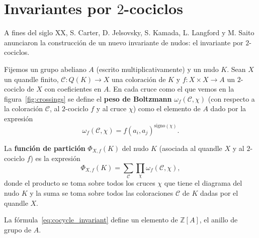 \documentclass[graybox]{svmult}
\newcommand{\Z}{\mathbb{Z}}
\begin{document}
\section{Invariantes por $2$-cociclos}
\label{section:cocycles}

A fines del siglo XX, S. Carter, D. Jelsovsky, S. Kamada, L. Langford y M.
Saito anunciaron la construcción de un nuevo invariante de nudos: el invariante
por $2$-cociclos.

Fijemos un grupo abeliano $A$ (escrito multiplicativamente) y un nudo $K$.
Sean $X$ un quandle finito, $\mathcal{C}\colon Q(K)\to X$ una coloración de $K$ y 
$f\colon X\times X\to A$ 
un $2$-cociclo de $X$ con coeficientes en $A$. En cada cruce como el que vemos en la
figura~\ref{fig:crossings} se define el \textbf{peso de Boltzmann}
$\omega_f(\mathcal{C},\chi)$ (con respecto a la coloración $\mathcal{C}$, al
$2$-cociclo $f$ y al cruce $\chi$) como el elemento de $A$ dado por la
expresión 
\[
	\omega_f(\mathcal{C},\chi) =f(a_i,a_j)^{\mathrm{signo}(\chi)}.
\]

\begin{definition}
	La \textbf{función de partición} $\Phi_{X,f}(K)$ del nudo $K$ (asociada al
	quandle $X$ y al $2$-cociclo $f$) es la expresión
	\begin{equation}
		\label{eq:cocycle_invariant}
		\Phi_{X,f}(K)=\sum_{\mathcal{C}}\prod_{\chi}\omega_f(\mathcal{C},\chi),
	\end{equation}
	donde el producto se toma sobre todos los cruces $\chi$ que tiene el
	diagrama del nudo $K$ y la suma se toma sobre todos las coloraciones
	$\mathcal{C}$ de $K$ dadas por el quandle $X$.  
\end{definition}

La fórmula~\eqref{eq:cocycle_invariant} define un elemento de $\Z[A]$, el
anillo de grupo de $A$.
\end{document}

